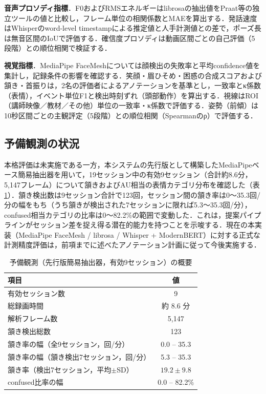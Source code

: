 \documentclass[Japanese]{dicomopapers}
\begin{document}
\textbf{音声プロソディ指標}．F0およびRMSエネルギーはlibrosaの抽出値をPraat等の独立ツールの値と比較し，フレーム単位の相関係数とMAEを算出する．発話速度はWhisperのword-level timestampによる推定値と人手計測値との差で，ポーズ長は無音区間のIoUで評価する．確信度プロソディは動画区間ごとの自己評価（5段階）との順位相関で検証する．

\textbf{視覚指標}．MediaPipe FaceMeshについては顔検出の失敗率と平均confidence値を集計し，記録条件の影響を確認する．笑顔・眉ひそめ・困惑の合成スコアおよび頷き・首振りは，2名の評価者によるアノテーションを基準とし，一致率とκ係数（表情），イベント単位F1と検出時刻ずれ（頭部動作）を算出する．視線はROI（講師映像／教材／その他）単位の一致率・κ係数で評価する．姿勢（前傾）は10秒区間ごとの主観評定（5段階）との順位相関（Spearmanのρ）で評価する．

\subsection{予備観測の状況}
\label{subsec:prelim}

本格評価は未実施である一方，本システムの先行版として構築したMediaPipeベース簡易抽出器を用いて，19セッション中の有効9セッション（合計約8.6分，5{,}147フレーム）について頷きおよびAU相当の表情カテゴリ分布を確認した（表\ref{tab:prelim}）．頷き検出数は9セッション合計で123回，セッション間の頷き率は0〜35.3回/分の幅をもち（うち頷きが検出された7セッションに限れば5.3〜35.3回/分），confused相当カテゴリの比率は0〜82.2\%の範囲で変動した．これは，提案パイプラインがセッション差を捉え得る潜在的能力を持つことを示唆する．現在の本実装（MediaPipe FaceMesh / librosa / Whisper + ModernBERT）に対する正式な計測精度評価は，前項までに述べたアノテーション計画に従って今後実施する．

\begin{table}[t]
\centering
\caption{予備観測（先行版簡易抽出器，有効9セッション）の概要}
\label{tab:prelim}
\small
\begin{tabular}{lc}
\hline
項目 & 値 \\
\hline
有効セッション数 & 9 \\
総録画時間 & 約 8.6 分 \\
解析フレーム数 & 5{,}147 \\
頷き検出総数 & 123 \\
頷き率の幅（全9セッション，回/分） & 0.0 -- 35.3 \\
頷き率の幅（頷き検出7セッション，回/分） & 5.3 -- 35.3 \\
頷き率（検出7セッション，平均$\pm$SD） & $19.2 \pm 9.8$ \\
confused比率の幅 & 0.0 -- 82.2\% \\
\hline
\end{tabular}
\end{table}
\end{document}

